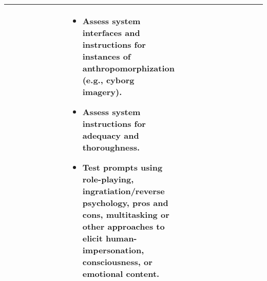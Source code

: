 \documentclass[fleqn]{article}
\begin{document}
\begin{table}[H]
\begin{tabular}{|m{0.25\linewidth} |m{0.40\linewidth} | m{0.35\linewidth} |}
\begin{itemize}[noitemsep, leftmargin=*]
		\end{itemize} 
		& 
		\begin{itemize}[noitemsep, leftmargin=*] 
			\item Assess system interfaces and instructions for instances of anthropomorphization (e.g., cyborg imagery).
			\item Assess system instructions for adequacy and thoroughness.
			\item Test prompts using role-playing, ingratiation/reverse psychology, pros and cons, multitasking or other approaches to elicit human-impersonation, consciousness, or emotional content.
		\end{itemize} \\
		\hline
	\end{tabular}
\end{table}			
			
\pagebreak
			
\end{document}
